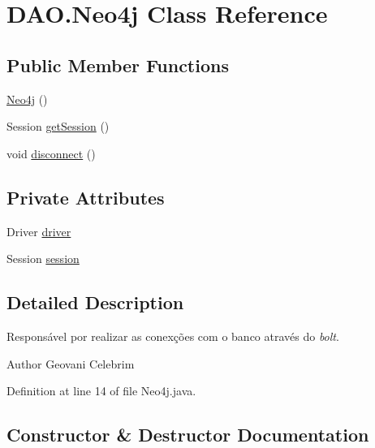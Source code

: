 \hypertarget{classDAO_1_1Neo4j}{}\section{D\+A\+O.\+Neo4j Class Reference}
\label{classDAO_1_1Neo4j}
\subsection*{Public Member Functions}
\begin{DoxyCompactItemize}
\item 
\hyperlink{classDAO_1_1Neo4j_af58dea23a60d5a3d38de5846b4aa0d47}{Neo4j} ()
\item 
Session \hyperlink{classDAO_1_1Neo4j_adcb642f9deb65fb53f10dbc2b16efd95}{get\+Session} ()
\item 
void \hyperlink{classDAO_1_1Neo4j_acf7e0b06aef5d1280ebe29857b6edd1c}{disconnect} ()
\end{DoxyCompactItemize}
\subsection*{Private Attributes}
\begin{DoxyCompactItemize}
\item 
Driver \hyperlink{classDAO_1_1Neo4j_ae39f48e933894d2bc2c742a1e6f39fa7}{driver}
\item 
Session \hyperlink{classDAO_1_1Neo4j_a504ee636d54273588fb7dd480c7bb1ee}{session}
\end{DoxyCompactItemize}


\subsection{Detailed Description}
Responsável por realizar as conexções com o banco através do {\itshape bolt}.

\begin{DoxyAuthor}{Author}
Geovani Celebrim 
\end{DoxyAuthor}


Definition at line 14 of file Neo4j.\+java.



\subsection{Constructor \& Destructor Documentation}
\hypertarget{classDAO_1_1Neo4j_af58dea23a60d5a3d38de5846b4aa0d47}{}\label{classDAO_1_1Neo4j_af58dea23a60d5a3d38de5846b4aa0d47} 
